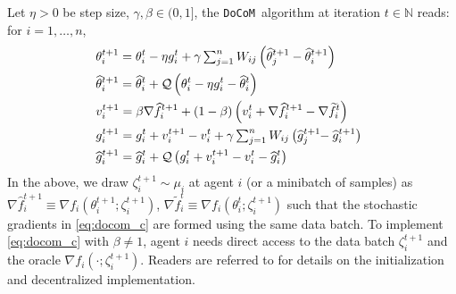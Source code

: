 \documentclass[10pt]{article} %
\newcommand{\revision}{}
\theoremstyle{plain}
\theoremstyle{definition}
\theoremstyle{remark}
\newcommand{\aname}{{\tt DoCoM}}
\newcommand{\prm}{\theta}
\newcommand{\hatprm}{\widehat{\prm}}
\newcommand{\gog}{g}
\newcommand{\hatgog}{\widehat{\gog}}
\newcommand{\ve}{v}
\newcommand{\stocgrdf}{\nabla \widehat{f}}
\newcommand{\stocgrdfp}{\nabla \widetilde{f}}
\begin{document}
Let $\eta > 0$ be step size, $\gamma, \beta \in (0,1]$, the \aname~algorithm at iteration $t \in \mathbb{N}$ reads: for $i=1,\ldots,n$,
\vspace{-.15cm}
\noindent 
\begin{subequations} \label{eq:algo}
\begin{align}
     \hspace{-.2cm} &  \prm_i^{t+1} = \prm_i^t - \eta \gog_i^t + \gamma \textstyle\sum_{j=1}^n W_{ij} \left( \hatprm_j^{t+1} - \hatprm_i^{t+1} \right) \label{eq:docom_a} \\
    \hspace{-.2cm} & \hatprm_i^{t+1} = \hatprm_i^t + {\cal Q} \left( \prm_i^t - \eta \gog_i^t - \hatprm_i^t \right) \label{eq:docom_b} \\
    \hspace{-.2cm} & \ve_i^{t+1} = \beta \stocgrdf_i^{t+1} + (1-\beta) \left( \ve_i^t + \stocgrdf_i^{t+1} - \stocgrdfp_i^{t} \right) \label{eq:docom_c} \\
    \hspace{-.2cm} &  \gog_i^{t+1} = \gog_i^t + \ve_i^{t+1} - \ve_i^t + \gamma \textstyle\sum_{j=1}^n W_{ij} \left( \hatgog_j^{t+1} \hspace{-.1cm} - \hatgog_i^{t+1} \right)  \label{eq:docom_d} \\
    \hspace{-.2cm} & \hatgog_i^{t+1} = \hatgog_i^t + {\cal Q} \left( \gog_i^t + \ve_i^{t+1} - \ve_i^t - \hatgog_i^t \right) \label{eq:docom_e}
\end{align}
\end{subequations}
In the above, we draw $\zeta_i^{t+1} \sim \mu_i$ at agent $i$ (or a minibatch of samples) as $\stocgrdf_i^{t+1} \equiv \nabla f_i( \theta_i^{t+1}; \zeta_i^{t+1} )$, $\stocgrdfp_i^t \equiv \nabla f_i( \theta_i^{t}; \zeta_i^{t+1} )$ such that the stochastic gradients in \eqref{eq:docom_c} are formed using the same data batch.
{\revision To implement \eqref{eq:docom_c}  with $\beta \neq 1$, agent $i$ needs direct access to the data batch $\zeta_i^{t+1}$ and the oracle $\nabla f_i( \cdot; \zeta_i^{t+1} )$.} Readers are  referred to  for details on the initialization and decentralized implementation.
\end{document}
